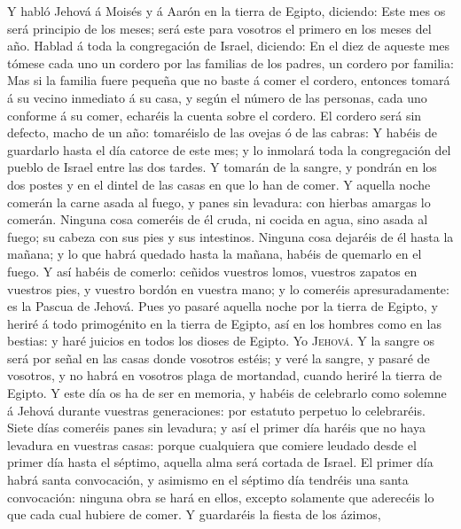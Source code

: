  Y habló Jehová á Moisés y á Aarón en la tierra de Egipto,
diciendo:  Este mes os será principio de los meses; será
este para vosotros el primero en los meses del año. 
Hablad á toda la congregación de Israel, diciendo: En el diez de aqueste
mes tómese cada uno un cordero por las familias de los padres, un
cordero por familia:  Mas si la familia fuere pequeña que
no baste á comer el cordero, entonces tomará á su vecino inmediato á su
casa, y según el número de las personas, cada uno conforme á su comer,
echaréis la cuenta sobre el cordero.  El cordero será sin
defecto, macho de un año: tomaréislo de las ovejas ó de las cabras:
 Y habéis de guardarlo hasta el día catorce de este mes; y
lo inmolará toda la congregación del pueblo de Israel entre las dos
tardes.  Y tomarán de la sangre, y pondrán en los dos
postes y en el dintel de las casas en que lo han de comer.
 Y aquella noche comerán la carne asada al fuego, y panes
sin levadura: con hierbas amargas lo comerán.  Ninguna
cosa comeréis de él cruda, ni cocida en agua, sino asada al fuego; su
cabeza con sus pies y sus intestinos.  Ninguna cosa
dejaréis de él hasta la mañana; y lo que habrá quedado hasta la mañana,
habéis de quemarlo en el fuego.  Y así habéis de comerlo:
ceñidos vuestros lomos, vuestros zapatos en vuestros pies, y vuestro
bordón en vuestra mano; y lo comeréis apresuradamente: es la Pascua de
Jehová.  Pues yo pasaré aquella noche por la tierra de
Egipto, y heriré á todo primogénito en la tierra de Egipto, así en los
hombres como en las bestias: y haré juicios en todos los dioses de
Egipto. Yo \textsc{Jehová}.  Y la sangre os será por
señal en las casas donde vosotros estéis; y veré la sangre, y pasaré de
vosotros, y no habrá en vosotros plaga de mortandad, cuando heriré la
tierra de Egipto.  Y este día os ha de ser en memoria, y
habéis de celebrarlo como solemne á Jehová durante vuestras
generaciones: por estatuto perpetuo lo celebraréis. 
Siete días comeréis panes sin levadura; y así el primer día haréis que
no haya levadura en vuestras casas: porque cualquiera que comiere
leudado desde el primer día hasta el séptimo, aquella alma será cortada
de Israel.  El primer día habrá santa convocación, y
asimismo en el séptimo día tendréis una santa convocación: ninguna obra
se hará en ellos, excepto solamente que aderecéis lo que cada cual
hubiere de comer.  Y guardaréis la fiesta de los ázimos,
